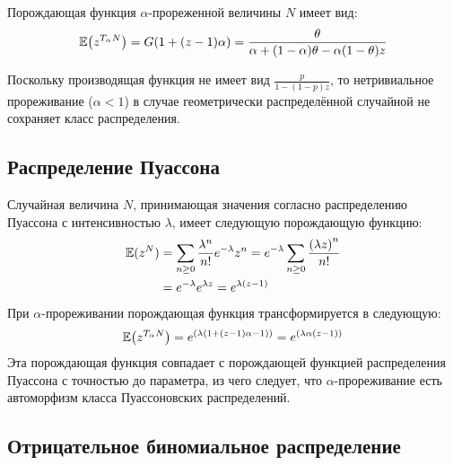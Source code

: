 \documentclass[a4paper]{article}
\let\originalleft\left
\let\originalright\right
\renewcommand{\left}{\mathopen{}\mathclose\bgroup\originalleft}
\renewcommand{\right}{\aftergroup\egroup\originalright}
\newcommand{\brac}[1]{{\left ( #1 \right )}}
\newcommand{\Ex}[0]{{\mathbb{E}}}
\begin{document}
Порождающая функция $\alpha$-прореженной величины $N$ имеет вид:
\[ \Ex\brac{z^{T_\alpha N}} = G\brac{1 + (z-1) \alpha}
= \frac{\theta}{\alpha + (1-\alpha) \theta - \alpha (1-\theta) z }\]

Поскольку производящая функция не имеет вид $\frac{p}{1-(1-p)z}$, то
нетривиальное прореживание ($\alpha < 1$) в случае геометрически
распределённой случайной не сохраняет класс распределения.


\subsection{Распределение Пуассона} %
\label{sub:Poisson_distribution}

Случайная величина $N$, принимающая значения согласно распределению Пуассона с
интенсивностью $\lambda$, имеет следующую порождающую функцию:
\begin{align*}
	\Ex(z^N) & = \sum_{n\geq 0} \frac{\lambda^n}{n!} e^{-\lambda} z^n
	= e^{-\lambda} \sum_{n\geq 0} \frac{\brac{\lambda z}^n}{n!} \\
	& = e^{-\lambda} e^{\lambda z} = e^{\lambda (z-1) }
\end{align*}
При $\alpha$-прореживании порождающая функция трансформируется в следующую:
\[\Ex\brac{z^{T_\alpha N}} = e^\brac{\lambda \brac{1 + (z-1) \alpha-1}} = e^\brac{\lambda \alpha (z-1)}\]
Эта порождающая функция совпадает с порождающей функцией распределения
Пуассона с точностью до параметра, из чего следует, что $\alpha$-прореживание
есть автоморфизм класса Пуассоновских распределений.


\subsection{Отрицательное биномиальное распределение} %
\label{sub:negative_binomial}
\end{document}
